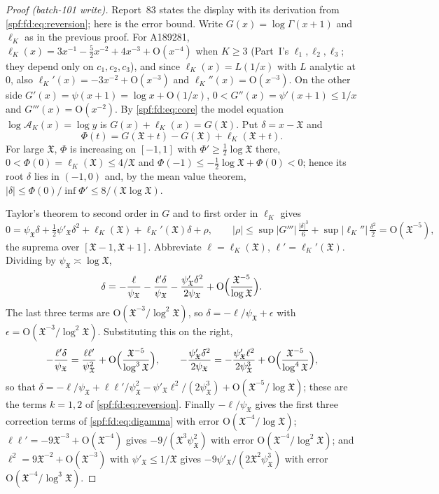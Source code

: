 \documentclass[11pt]{article}
\numberwithin{equation}{section}
\theoremstyle{definition}
\theoremstyle{remark}
\theoremstyle{definition}
\newcommand{\bigO}{\mathrm O}
\begin{document}
\begin{proof}[Proof (batch-101 write)]
Report~83 states the display with its derivation from
\eqref{spf:fd:eq:reversion}; here is the error bound. Write $G(x)=\log\Gamma(x+1)$ and $\ell_K$ as in the previous proof. For A189281,
$\ell_K(x)=3x^{-1}-\frac52x^{-2}+4x^{-3}+\bigO(x^{-4})$ when $K\ge3$
(Part~I's $\ell_1,\ell_2,\ell_3$; they depend only on $c_1,c_2,c_3$), and
since $\ell_K(x)=L(1/x)$ with $L$ analytic at $0$, also
$\ell_K'(x)=-3x^{-2}+\bigO(x^{-3})$ and $\ell_K''(x)=\bigO(x^{-3})$. On the
other side $G'(x)=\psi(x+1)=\log x+\bigO(1/x)$, $0<G''(x)=\psi'(x+1)\le1/x$
and $G'''(x)=\bigO(x^{-2})$. By \eqref{spf:fd:eq:core} the model equation
$\log\mathcal A_K(x)=\log y$ is $G(x)+\ell_K(x)=G(\mathfrak X)$. Put
$\delta=x-\mathfrak X$ and
\[
 \Phi(t)=G(\mathfrak X+t)-G(\mathfrak X)+\ell_K(\mathfrak X+t).
\]
For large $\mathfrak X$, $\Phi$ is increasing on $[-1,1]$ with
$\Phi'\ge\frac12\log\mathfrak X$ there, $0<\Phi(0)=\ell_K(\mathfrak X)\le4/\mathfrak X$
and $\Phi(-1)\le-\frac12\log\mathfrak X+\Phi(0)<0$; hence its root $\delta$
lies in $(-1,0)$ and, by the mean value theorem,
$|\delta|\le\Phi(0)/\inf\Phi'\le8/(\mathfrak X\log\mathfrak X)$.

Taylor's theorem to second order in $G$ and to first order in $\ell_K$ gives
\[
 0=\psi_{\mathfrak X}\delta+\tfrac12\psi'_{\mathfrak X}\delta^2
 +\ell_K(\mathfrak X)+\ell_K'(\mathfrak X)\delta+\rho,\qquad
 |\rho|\le\sup|G'''|\,\tfrac{|\delta|^3}6+\sup|\ell_K''|\,\tfrac{\delta^2}2
 =\bigO(\mathfrak X^{-5}),
\]
the suprema over $[\mathfrak X-1,\mathfrak X+1]$. Abbreviate $\ell=\ell_K(\mathfrak X)$,
$\ell'=\ell_K'(\mathfrak X)$. Dividing by $\psi_{\mathfrak X}\asymp\log\mathfrak X$,
\[
 \delta=-\frac{\ell}{\psi_{\mathfrak X}}-\frac{\ell'\delta}{\psi_{\mathfrak X}}
 -\frac{\psi'_{\mathfrak X}\delta^2}{2\psi_{\mathfrak X}}
 +\bigO\Bigl(\frac{\mathfrak X^{-5}}{\log\mathfrak X}\Bigr).
\]
The last three terms are $\bigO(\mathfrak X^{-3}/\log^2\mathfrak X)$, so
$\delta=-\ell/\psi_{\mathfrak X}+\epsilon$ with
$\epsilon=\bigO(\mathfrak X^{-3}/\log^2\mathfrak X)$. Substituting this on
the right,
\[
 -\frac{\ell'\delta}{\psi_{\mathfrak X}}=\frac{\ell\ell'}{\psi_{\mathfrak X}^2}
 +\bigO\Bigl(\frac{\mathfrak X^{-5}}{\log^3\mathfrak X}\Bigr),\qquad
 -\frac{\psi'_{\mathfrak X}\delta^2}{2\psi_{\mathfrak X}}
 =-\frac{\psi'_{\mathfrak X}\ell^2}{2\psi_{\mathfrak X}^3}
 +\bigO\Bigl(\frac{\mathfrak X^{-5}}{\log^4\mathfrak X}\Bigr),
\]
so that
$\delta=-\ell/\psi_{\mathfrak X}+\ell\ell'/\psi_{\mathfrak X}^2
-\psi'_{\mathfrak X}\ell^2/(2\psi_{\mathfrak X}^3)+\bigO(\mathfrak X^{-5}/\log\mathfrak X)$;
these are the terms $k=1,2$ of \eqref{spf:fd:eq:reversion}. Finally
$-\ell/\psi_{\mathfrak X}$ gives the first three correction terms of
\eqref{spf:fd:eq:digamma} with error $\bigO(\mathfrak X^{-4}/\log\mathfrak X)$;
$\ell\ell'=-9\mathfrak X^{-3}+\bigO(\mathfrak X^{-4})$ gives
$-9/(\mathfrak X^3\psi_{\mathfrak X}^2)$ with error
$\bigO(\mathfrak X^{-4}/\log^2\mathfrak X)$; and
$\ell^2=9\mathfrak X^{-2}+\bigO(\mathfrak X^{-3})$ with
$\psi'_{\mathfrak X}\le1/\mathfrak X$ gives
$-9\psi'_{\mathfrak X}/(2\mathfrak X^2\psi_{\mathfrak X}^3)$ with error
$\bigO(\mathfrak X^{-4}/\log^3\mathfrak X)$.
\end{proof}
\end{document}
